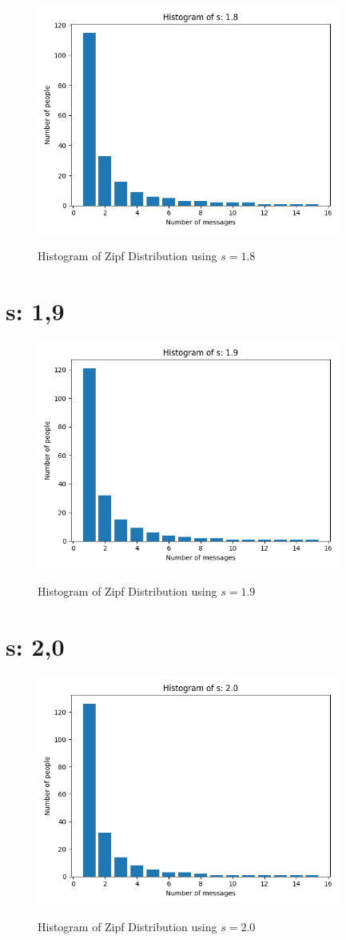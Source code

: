 \documentclass{article}
\begin{document}
\begin{figure}[H] \centering
 \includegraphics[width=10cm]{imgs/histogram-18.png}
 \label{fig:hist-18}
 \caption{Histogram of Zipf Distribution using $s=1.8$} \end{figure}




\section{s: 1,9}

\begin{figure}[H] \centering
 \includegraphics[width=10cm]{imgs/histogram-19.png}
 \label{fig:hist-19}
 \caption{Histogram of Zipf Distribution using $s=1.9$} \end{figure}




\section{s: 2,0}

\begin{figure}[H] \centering
 \includegraphics[width=10cm]{imgs/histogram-20.png}
 \label{fig:hist-20}
 \caption{Histogram of Zipf Distribution using $s=2.0$} \end{figure}


\end{document}

